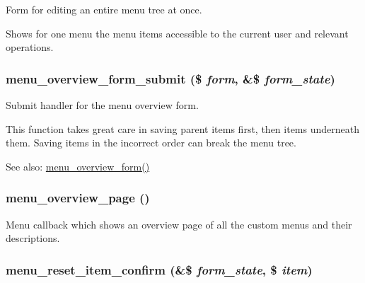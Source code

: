 Form for editing an entire menu tree at once.

Shows for one menu the menu items accessible to the current user and relevant operations. \hypertarget{menu_8admin_8inc_a16576d9e19529ee9f710dc3b5f5b810}{
\subsubsection[{menu\_\-overview\_\-form\_\-submit}]{\setlength{\rightskip}{0pt plus 5cm}menu\_\-overview\_\-form\_\-submit (\$ {\em form}, \/  \&\$ {\em form\_\-state})}}
\label{menu_8admin_8inc_a16576d9e19529ee9f710dc3b5f5b810}


Submit handler for the menu overview form.

This function takes great care in saving parent items first, then items underneath them. Saving items in the incorrect order can break the menu tree.

\begin{Desc}
\item[See also:]\hyperlink{menu_8admin_8inc_cddf1ae47e6d4796c437447fd1a1a88e}{menu\_\-overview\_\-form()} \end{Desc}
\hypertarget{menu_8admin_8inc_2815b30b87a9fb3bbda9cf044a81e25b}{
\subsubsection[{menu\_\-overview\_\-page}]{\setlength{\rightskip}{0pt plus 5cm}menu\_\-overview\_\-page ()}}
\label{menu_8admin_8inc_2815b30b87a9fb3bbda9cf044a81e25b}


Menu callback which shows an overview page of all the custom menus and their descriptions. \hypertarget{menu_8admin_8inc_c58d4364d0480d2fdfd2550ac10bfae0}{
\subsubsection[{menu\_\-reset\_\-item\_\-confirm}]{\setlength{\rightskip}{0pt plus 5cm}menu\_\-reset\_\-item\_\-confirm (\&\$ {\em form\_\-state}, \/  \$ {\em item})}}
\label{menu_8admin_8inc_c58d4364d0480d2fdfd2550ac10bfae0}


